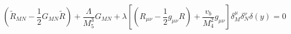 \begin{equation}
\label{einstein1}
\left(\tilde{R}_{MN} - \frac{1}{2} G_{MN} \tilde{R} \right)
+ \frac{\Lambda}{M_5^3} G_{MN}
+ \lambda \left[ \left(R_{\mu \nu} - \frac{1}{2} g_{\mu \nu} R\right)
                + \frac{v_b}{M_4^2} g_{\mu \nu} \right] \delta_M^{\mu}
                 \delta_N^{\nu} \delta(y) = 0
\end{equation}


